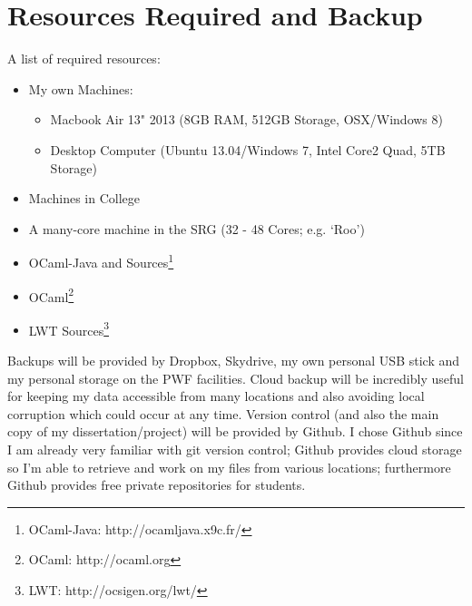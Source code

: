 \section{Resources Required and Backup}
\label{sec:resources}
A list of required resources:
\begin{itemize}
\item{My own Machines:
    \begin{itemize}
    \item{Macbook Air 13" 2013 (8GB RAM, 512GB Storage, OSX/Windows 8)}
    \item{Desktop Computer (Ubuntu 13.04/Windows 7, Intel Core2 Quad, 5TB Storage)}
    \end{itemize}
}
\item{Machines in College}
\item{A many-core machine in the SRG (32 - 48 Cores; e.g. `Roo')}
\item{OCaml-Java and Sources\footnote{OCaml-Java: http://ocamljava.x9c.fr/}}
\item{OCaml\footnote{OCaml: http://ocaml.org}}
\item{LWT Sources\footnote{LWT: http://ocsigen.org/lwt/}}
\end{itemize}

Backups will be provided by Dropbox, Skydrive, my own personal USB stick and my personal storage on the PWF facilities. Cloud backup will be incredibly useful for keeping my data accessible from many locations and also avoiding local corruption which could occur at any time.
Version control (and also the main copy of my dissertation/project) will be provided by Github. I chose Github since I am already very familiar with git version control; Github provides cloud storage so I'm able to retrieve and work on my files from various locations; furthermore Github provides free private repositories for students.


